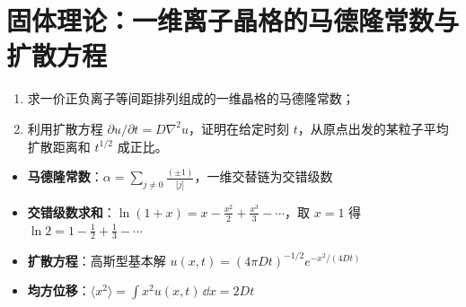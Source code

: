 \section{固体理论：一维离子晶格的马德隆常数与扩散方程}
\label{sec:madelung-diffusion}

\begin{modelbox}[题目：一维交替链的马德隆常数与扩散规律]
\begin{enumerate}
    \item 求一价正负离子等间距排列组成的一维晶格的马德隆常数；
    \item 利用扩散方程 $\partial u/\partial t=D\nabla^2 u$，证明在给定时刻 $t$，从原点出发的某粒子平均扩散距离和 $t^{1/2}$ 成正比。
\end{enumerate}
\end{modelbox}

\begin{tipbox}[考点快速分析]
\begin{itemize}
    \item \textbf{马德隆常数}：$\alpha=\sum_{j\neq0}\frac{(\pm1)}{|j|}$，一维交替链为交错级数
    \item \textbf{交错级数求和}：$\ln(1+x)=x-\frac{x^2}{2}+\frac{x^3}{3}-\cdots$，取 $x=1$ 得 $\ln2=1-\frac{1}{2}+\frac{1}{3}-\cdots$
    \item \textbf{扩散方程}：高斯型基本解 $u(x,t)=(4\pi Dt)^{-1/2}e^{-x^2/(4Dt)}$
    \item \textbf{均方位移}：$\langle x^2\rangle=\int x^2 u(x,t)\,\dd x=2Dt$
\end{itemize}
\end{tipbox}

